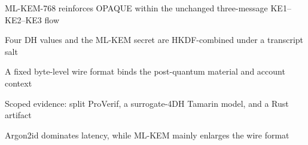 
\begin{highlights}
\item ML-KEM-768 reinforces OPAQUE within the unchanged three-message KE1--KE2--KE3 flow
\item Four DH values and the ML-KEM secret are HKDF-combined under a transcript salt
\item A fixed byte-level wire format binds the post-quantum material and account context
\item Scoped evidence: split ProVerif, a surrogate-4DH Tamarin model, and a Rust artifact
\item Argon2id dominates latency, while ML-KEM mainly enlarges the wire format
\end{highlights}
